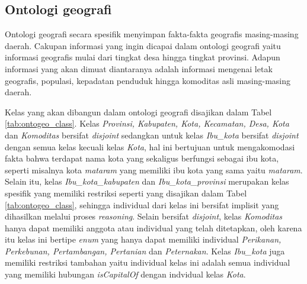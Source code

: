 \subsection{Ontologi geografi}
Ontologi geografi secara spesifik menyimpan fakta-fakta geografis masing-masing daerah. Cakupan informasi yang ingin dicapai dalam ontologi geografi yaitu informasi geografis mulai dari tingkat desa hingga tingkat provinsi. Adapun informasi yang akan dimuat diantaranya adalah informasi mengenai letak geografis, populasi, kepadatan penduduk hingga komoditas asli masing-masing daerah.

Kelas yang akan dibangun dalam ontologi geografi disajikan dalam Tabel \ref{tab:ontogeo_class}. Kelas \emph{Provinsi, Kabupaten, Kota, Kecamatan, Desa, Kota} dan \emph{Komoditas} bersifat \emph{disjoint} sedangkan untuk kelas \emph{Ibu\_kota} bersifat \emph{disjoint} dengan semua kelas kecuali kelas \emph{Kota}, hal ini bertujuan untuk mengakomodasi fakta bahwa terdapat nama kota yang sekaligus berfungsi sebagai ibu kota, seperti misalnya kota \emph{mataram} yang memiliki ibu kota yang sama yaitu \emph{mataram}. Selain itu, kelas \emph{Ibu\_kota\_kabupaten} dan \emph{Ibu\_kota\_provinsi} merupakan kelas spesifik yang memiliki restriksi seperti yang disajikan dalam Tabel \ref{tab:ontogeo_class}, sehingga individual dari kelas ini bersifat implisit yang dihasilkan melalui proses \emph{reasoning}. Selain bersifat \emph{disjoint}, kelas \emph{Komoditas} hanya dapat memiliki anggota atau individual yang telah ditetapkan, oleh karena itu kelas ini bertipe \emph{enum} yang hanya dapat memiliki individual \emph{Perikanan, Perkebunan, Pertambangan, Pertanian} dan \emph{Peternakan}. Kelas \emph{Ibu\_kota} juga memiliki restriksi tambahan yaitu individual kelas ini adalah semua individual yang memiliki hubungan \emph{isCapitalOf} dengan indvidual kelas \emph{Kota}. 

